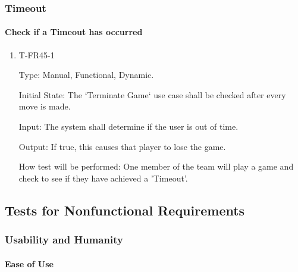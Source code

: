 \documentclass[12pt, titlepage]{article}
\begin{document}
\subsubsection{Timeout}

    \paragraph{Check if a Timeout has occurred}

            \begin{enumerate}

            \item{T-FR45-1\\}

                Type: Manual, Functional, Dynamic.
                					
                Initial State: The ‘Terminate Game‘ use case shall be checked after every move is made.
                					
                Input: The system shall determine if the user is out of time.
                					
                Output: If true, this causes that player to lose the game.

                How test will be performed: One member of the team will play a game and check to see if they have achieved a 'Timeout'.

            \end{enumerate}

\subsection{Tests for Nonfunctional Requirements}

\subsubsection{Usability and Humanity}
		
    \paragraph{Ease of Use}
    
\end{document}
